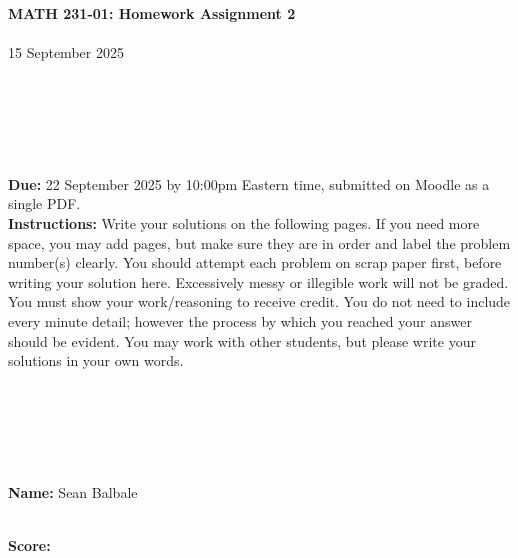 \documentclass[reqno, 12pt]{amsart}
\begin{document}
\begin{center}
{\bf MATH 231-01: Homework Assignment 2}\\~\\
15 September 2025\\~\\~\\~\\~\\~\\
\end{center}

{\bf Due:} 22 September 2025 by 10:00pm Eastern time, submitted on Moodle as a single PDF.~\\


{\bf Instructions:} Write your solutions on the following pages. If you need more space, you may add pages, but make sure they are in order and label the problem number(s) clearly. You should attempt each problem on scrap paper first, before writing your solution here. Excessively messy or illegible work will not be graded. You must show your work/reasoning to receive credit. You do not need to include every minute detail; however the process by which you reached your answer should be evident. You may work with other students, but please write your solutions in your own words.

~\\~\\~\\~\\~\\
{\bf Name:} Sean Balbale

~\\
{\bf Score:}
\end{document}
